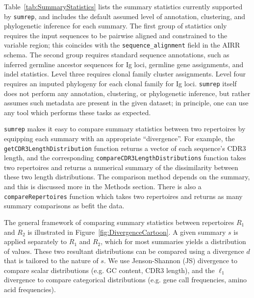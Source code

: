 \documentclass{article}
\begin{document}
Table~\ref{tab:SummaryStatistics} lists the summary statistics currently supported by \texttt{sumrep}, and includes the default assumed level of annotation, clustering, and phylogenetic inference for each summary.
The first group of statistics only requires the input sequences to be pairwise aligned and constrained to the variable region; this coincides with the \texttt{sequence\_alignment} field in the AIRR schema.
The second group requires standard sequence annotations, such as inferred germline ancestor sequences for Ig loci, germline gene assignments, and indel statistics.
Level three requires clonal family cluster assignments.
Level four requires an imputed phylogeny for each clonal family for Ig loci.
\texttt{sumrep} itself does not perform any annotation, clustering, or phylogenetic inference, but rather assumes such metadata are present in the given dataset; in principle, one can use any tool which performs these tasks as expected.

\texttt{sumrep} makes it easy to compare summary statistics between two repertoires by equipping each summary with an appropriate ``divergence''.
For example, the \texttt{getCDR3LengthDistribution} function returns a vector of each sequence's CDR3 length, and the corresponding \texttt{compareCDR3LengthDistributions} function takes two repertoires and returns a numerical summary of the dissimilarity between these two length distributions.
The comparison method depends on the summary, and this is discussed more in the Methods section.
There is also a \texttt{compareRepertoires} function which takes two repertoires and returns as many summary comparisons as befit the data.

The general framework of comparing summary statistics between repertoires $R_1$ and $R_2$ is illustrated in Figure~\ref{fig:DivergenceCartoon}.
A given summary $s$ is applied separately to $R_1$ and $R_2$, which for most summaries yields a distribution of values.
These two resultant distributions can be compared using a divergence $d$ that is tailored to the nature of $s$.
We use Jenson-Shannon (JS) divergence to compare scalar distributions (e.g. GC content, CDR3 length), and the $\ell_1$ divergence to compare categorical distributions (e.g. gene call frequencies, amino acid frequencies).
\end{document}

